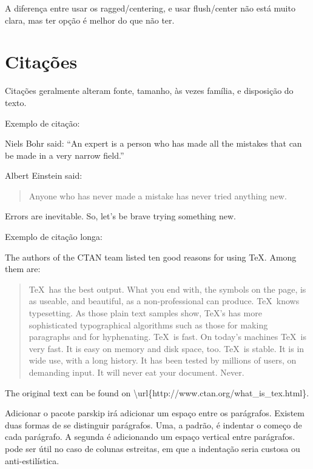 \begin{flushright}
\end{flushright}

\begin{center}
\end{center}

\begin{flushleft}
\end{flushleft}

A diferença entre usar os ragged/centering,
e usar flush/center não está muito clara,
mas ter opção é melhor do que não ter.

\section{Citações}
Citações geralmente alteram fonte, tamanho, às vezes família, e disposição do texto.

Exemplo de citação:

Niels Bohr said: ``An expert is a person who has made
all the mistakes that can be made in a very narrow field.''

Albert Einstein said:

\begin{quote}
    Anyone who has never made a mistake has never tried anything new.
\end{quote}
Errors are inevitable. So, let's be brave trying something new.


Exemplo de citação longa:

The authors of the CTAN team listed ten good reasons
for using \TeX. Among them are:
\begin{quotation}
 \TeX\ has the best output. What you end with,
the symbols on the page, is as useable, and beautiful,
as a non-professional can produce.
 \TeX\ knows typesetting. As those plain text samples
show, \TeX's has more sophisticated typographical algorithms
such as those for making paragraphs and for hyphenating.
 \TeX\ is fast. On today's machines \TeX\ is very fast.
 It is easy on memory and disk space, too.
 \TeX\ is stable. It is in wide use, with a long history.
 It has been tested by millions of users, on demanding input.
 It will never eat your document. Never.
\end{quotation}
The original text can be found on
\textbackslash url\{http://www.ctan.org/what\_is\_tex.html\}.

Adicionar o pacote parskip irá adicionar um espaço entre os parágrafos.
Existem duas formas de se distinguir parágrafos.
Uma, a padrão, é indentar o começo de cada parágrafo.
A segunda é adicionando um espaço vertical entre parágrafos.
pode ser útil no caso de colunas estreitas, em que a indentação seria custosa ou anti-estilística.


\newpage
